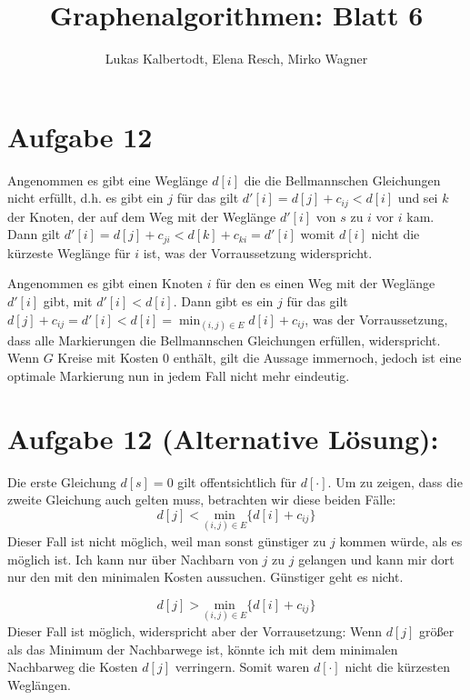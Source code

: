 \documentclass[11pt]{scrartcl} %
\title{Graphenalgorithmen: Blatt 6}
\author{Lukas Kalbertodt, Elena Resch, Mirko Wagner}
\begin{document}
\maketitle

\section*{Aufgabe 12}
\begin{compactenum}[(a)]
\item Angenommen es gibt eine Weglänge $d[i]$ die die Bellmannschen Gleichungen nicht erfüllt, d.h. es gibt ein $j$ für das gilt $d'[i]=d[j]+c_{ij}<d[i]$ und
sei $k$ der Knoten, der auf dem Weg mit der Weglänge $d'[i]$ von $s$ zu $i$ vor
$i$ kam. Dann gilt $d'[i]=d[j]+c_{ji}<d[k]+c_{ki}=d'[i]$ womit $d[i]$ nicht die
kürzeste Weglänge für $i$ ist, was der Vorraussetzung widerspricht.

\item Angenommen es gibt einen Knoten $i$ für den es einen Weg mit der Weglänge
$d'[i]$ gibt, mit $d'[i]<d[i]$. Dann gibt es ein $j$ für das gilt
$d[j]+c_{ij}=d'[i]<d[i]=\min_{(i,j)\in E}{d[i]+c_{ij}}$, was der Vorraussetzung,
dass alle Markierungen die Bellmannschen Gleichungen erfüllen, widerspricht.
\newline
Wenn $G$ Kreise mit Kosten 0 enthält, gilt die Aussage immernoch, jedoch ist
eine optimale Markierung nun in jedem Fall nicht mehr eindeutig.
\end{compactenum}

\section*{Aufgabe 12 (Alternative Lösung):}
\begin{compactenum}[(a)]
\item Die erste Gleichung $d[s] = 0$ gilt offentsichtlich für $d[\cdot]$. Um zu zeigen, dass die zweite Gleichung auch gelten muss, betrachten wir diese beiden Fälle:\\
\[d[j] < \underset{(i,j)\in E}{\text{min}} \{d[i]+c_{ij}\}\]
Dieser Fall ist nicht möglich, weil man sonst günstiger zu $j$ kommen würde, als es möglich ist. Ich kann nur über Nachbarn von $j$ zu $j$ gelangen und kann mir dort nur den mit den minimalen Kosten aussuchen. Günstiger geht es nicht.

\[d[j] > \underset{(i,j)\in E}{\text{min}} \{d[i]+c_{ij}\}\]
Dieser Fall ist möglich, widerspricht aber der Vorrausetzung: Wenn $d[j]$ größer als das Minimum der Nachbarwege ist, könnte ich mit dem minimalen Nachbarweg die Kosten $d[j]$ verringern. Somit waren $d[\cdot]$ nicht die kürzesten Weglängen.


\end{compactenum}
\end{document}
